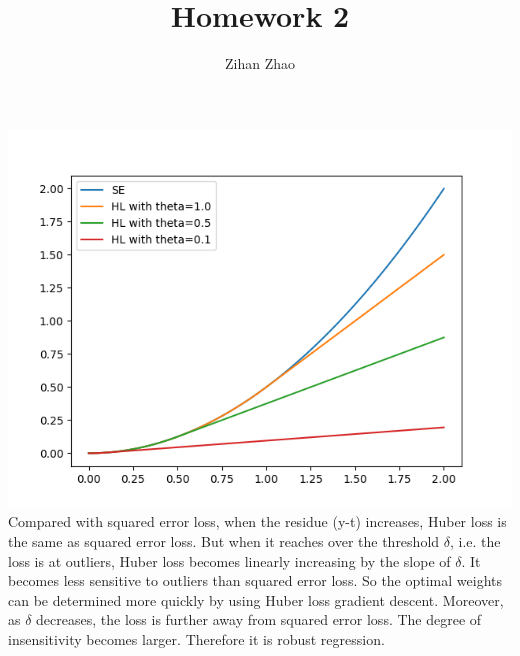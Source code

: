 \documentclass{article}
\author{Zihan Zhao}
\affil{1001103708}
\title{Homework 2}
\date{}
\begin{document}
\maketitle
\section{}
\renewcommand{\thesubsection}{(\alph{subsection})}
\subsection{}
\includegraphics{q1a.png}
Compared with squared error loss, when the residue (y-t) increases, Huber loss is the same as squared error loss. But when it reaches over the threshold $\delta$, i.e. the loss is at outliers, Huber loss becomes linearly increasing by the slope of $\delta$. It becomes less sensitive to outliers than squared error loss. So the optimal weights can be determined more quickly by using Huber loss gradient descent. Moreover, as $\delta$ decreases, the loss is further away from squared error loss. The degree of insensitivity becomes larger. Therefore it is robust regression.
\end{document}
